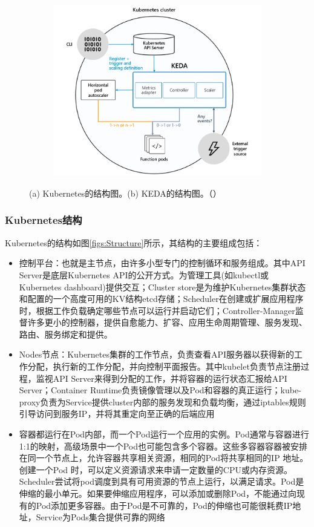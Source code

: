 \begin{figure}[!htbp]
\begin{subfigure}[b]{0.62\linewidth}
		\includegraphics[width=\linewidth]{figs/KEDA}
		\caption{}
		\label{figs:KEDA}
	\end{subfigure}
	\caption{(a) Kubernetes的结构图。(b) KEDA的结构图。（\cite{Kubernetes}）}
\end{figure}

\subsubsection{Kubernetes结构}
Kubernetes的结构如图\ref{figs:Structure}所示，其结构的主要组成包括：
\begin{itemize}
	\item 控制平台：也就是主节点，由许多小型专门的控制循环和服务组成。其中API Server是底层Kubernetes API的公开方式。为管理工具(如kubectl或Kubernetes dashboard)提供交互；Cluster store是为维护Kubernetes集群状态和配置的一个高度可用的KV结构etcd存储；Scheduler在创建或扩展应用程序时，根据工作负载确定哪些节点可以运行并启动它们；Controller-Manager监督许多更小的控制器，提供自愈能力、扩容、应用生命周期管理、服务发现、路由、服务绑定和提供。
	\item Nodes节点：Kubernetes集群的工作节点，负责查看API服务器以获得新的工作分配，执行新的工作分配，并向控制平面报告。其中kubelet负责节点注册过程，监视API Server来得到分配的工作，并将容器的运行状态汇报给API Server；Container Runtime负责镜像管理以及Pod和容器的真正运行；kube-proxy负责为Service提供cluster内部的服务发现和负载均衡，通过iptables规则引导访问到服务IP，并将其重定向至正确的后端应用
	\item 容器都运行在Pod内部，而一个Pod运行一个应用的实例。Pod通常与容器进行1:1的映射，高级场景中一个Pod也可能包含多个容器。这些多容器容器被安排在同一个节点上，允许容器共享相关资源，相同的Pod将共享相同的IP 地址。创建一个Pod 时，可以定义资源请求来申请一定数量的CPU或内存资源。Scheduler尝试将pod调度到具有可用资源的节点上运行，以满足请求。Pod是伸缩的最小单元。如果要伸缩应用程序，可以添加或删除Pod，不能通过向现有的Pod添加更多容器。由于Pod是不可靠的，Pod的伸缩也可能很耗费IP地址，Service为Pods集合提供可靠的网络
\end{itemize}


